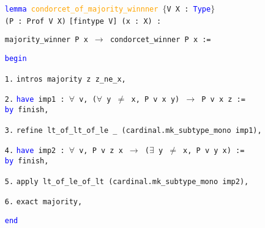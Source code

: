 \documentclass[12pt,xcolor=svgnames,blue,aspectratio=169]{beamer}
\begin{document}
\begin{frame}
\begin{itemize}
\item[] \texttt{\textcolor{blue}{lemma} \textcolor{orange}{condorcet\_of\_majority\_winnner} $\{$V X : \textcolor{blue}{Type}$\}$\\ (P : Prof V X)}
\texttt{[fintype V] (x : X) :}

 \texttt{majority\_winner P x $\to$ condorcet\_winner P x :=} 

\textcolor{blue}{\texttt{begin}}

\item[\texttt{1.}]\quad  \texttt{intros majority z z\_ne\_x,}  
 
 

\item[\texttt{2.}]\quad  \texttt{\textcolor{blue}{have} imp1 : $\forall$ v, ($\forall$ y $\neq$ x, P v x y) $\to$ P v x z :=  \\ \quad \textcolor{blue}{by} finish,} 


  
\item[\texttt{3.}]\quad  \texttt{refine lt\_of\_lt\_of\_le \_ (cardinal.mk\_subtype\_mono imp1),} 
 
\item[\texttt{4.}]\quad  \texttt{\textcolor{blue}{have} imp2 : $\forall$ v, P v z x $\to$ ($\exists$ y $\neq$ x, P v y x) :=\\\quad \textcolor{blue}{by} finish,} 
 
  
  
  
 \item[\texttt{5.}]\quad  \texttt{apply lt\_of\_le\_of\_lt (cardinal.mk\_subtype\_mono imp2),} 
  
\item[\texttt{6.}]\quad  \texttt{exact majority, }
  
\textcolor{blue}{\texttt{end}}
\end{itemize}


\end{frame}
\end{document}
